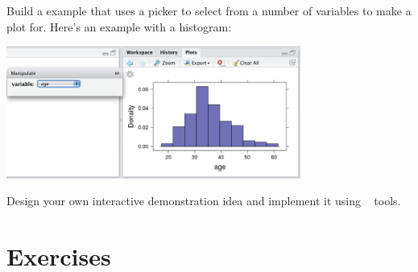 \begin{problem}
Build a  example that uses a picker to select from a number of 
variables to make a plot for.  Here's an example with a histogram:

\medskip
\centerline{\includegraphics[width=3.8in]{images/manipulate-multihist}}
\end{problem}

\begin{problem}
Design your own  interactive demonstration idea and implement it using 
\RStudio\  tools.
\end{problem}

\section*{Exercises}
\shipoutProblems

